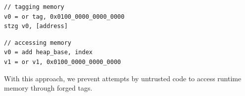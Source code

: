 \begin{lstlisting}[frame=h,style=customc,
    label={lst:generated-code-tagging}]
// tagging memory
v0 = or tag, 0x0100_0000_0000_0000
stzg v0, [address]
\end{lstlisting}

\begin{lstlisting}[frame=h,style=customc,
    label={lst:generated-code-mem-access}]
// accessing memory
v0 = add heap_base, index
v1 = or v1, 0x0100_0000_0000_0000
\end{lstlisting}

With this approach, we prevent attempts by untrusted code to access runtime memory through forged tags.

